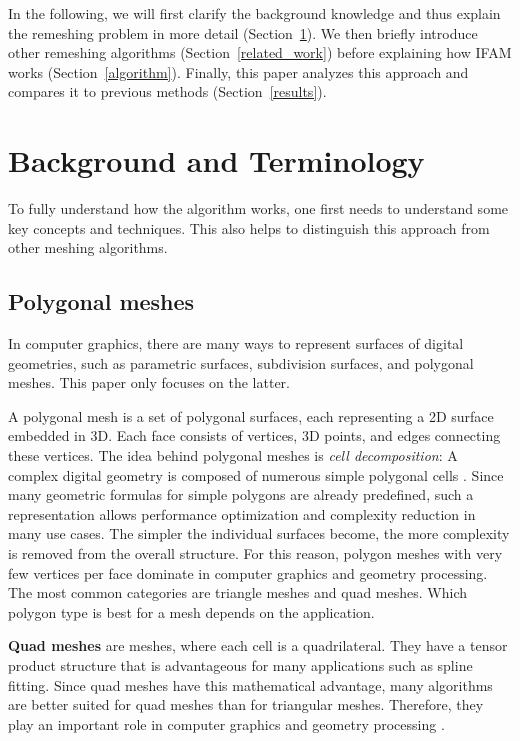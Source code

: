 \documentclass{ACGSeminar}
\begin{document}
In the following, we will first clarify the background knowledge and thus explain the remeshing problem in more detail (Section~\ref{background}). We then briefly introduce other remeshing algorithms (Section~\ref{related_work}) before explaining how IFAM works (Section~\ref{algorithm}). Finally, this paper analyzes this approach and compares it to previous methods (Section~\ref{results}).

\section{Background and Terminology}\label{background}
To fully understand how the algorithm works, one first needs to understand some key concepts and techniques. This also helps to distinguish this approach from other meshing algorithms.

\subsection{Polygonal meshes}
In computer graphics, there are many ways to represent surfaces of digital geometries, such as parametric surfaces, subdivision surfaces, and polygonal meshes. This paper only focuses on the latter.\bigskip

A polygonal mesh is a set of polygonal surfaces, each representing a 2D surface embedded in 3D. Each face consists of vertices, 3D points, and edges connecting these vertices. The idea behind polygonal meshes is \textit{cell decomposition}: A complex digital geometry is composed of numerous simple polygonal cells \cite{bommes2013quad}. Since many geometric formulas for simple polygons are already predefined, such a representation allows performance optimization and complexity reduction in many use cases. The simpler the individual surfaces become, the more complexity is removed from the overall structure. For this reason, polygon meshes with very few vertices per face dominate in computer graphics and geometry processing. The most common categories are triangle meshes and quad meshes. Which polygon type is best for a mesh depends on the application.\bigskip

\textbf{Quad meshes} are meshes, where each cell is a quadrilateral. They have a tensor product structure that is advantageous for many applications such as spline fitting. Since quad meshes have this mathematical advantage, many algorithms are better suited for quad meshes than for triangular meshes. Therefore, they play an important role in computer graphics and geometry processing \cite{bommes2013quad, chen2019quadrilateral}.\bigskip
\end{document}
